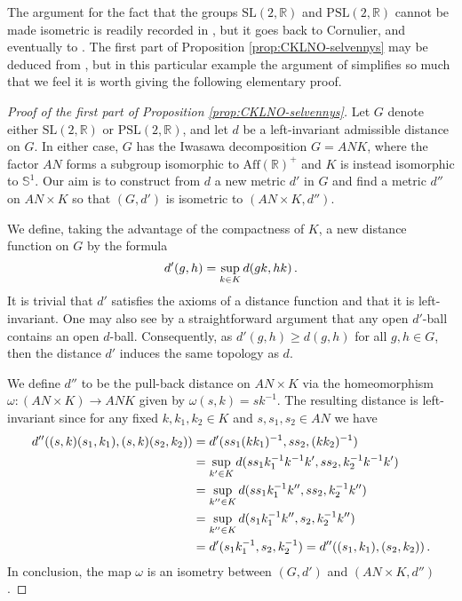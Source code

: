\documentclass[a4paper,12pt]{amsart}
\newcommand{\pp}{\mathrm}
\theoremstyle{plain}
\theoremstyle{definition}
\theoremstyle{plain}
\theoremstyle{remark}
\begin{document}
The argument  for the fact that the groups \( \pp{SL}(2,\mathbb{R}) \) and \( \pp{PSL}(2,\mathbb{R}) \) cannot be made isometric is readily recorded in \cite[Proposition 2.11]{avain:fasslerledonne}, but it goes back to Cornulier, and eventually to \cite[Theorem 2.2]{gordon-transitive}. The first part of Proposition \ref{prop:CKLNO-selvennys} may be deduced from  \cite[Theorem 3.24]{avain:CKLNO}, but in this particular example the argument of \cite{avain:CKLNO} simplifies so much that we feel it is worth giving the following elementary proof.

\begin{proof}[Proof of the first part of Proposition \ref{prop:CKLNO-selvennys}]
Let \( G \) denote either \( \pp{SL}(2,\mathbb{R}) \) or \( \pp{PSL}(2,\mathbb{R}) \), and let \( d \) be a left-invariant admissible distance on \( G \). In either case, \( G \) has the Iwasawa decomposition \( G = A N K \), where the factor \( AN \) forms a subgroup isomorphic to \( \pp{Aff}(\mathbb{R})^+ \) and \( K \) is instead isomorphic to \( \mathbb{S}^1 \). Our aim is to construct from \( d \) a new metric \( d' \) in \( G\) and find a metric \( d'' \) on \( AN \times K \) so that \( (G,d') \) is isometric to \( (AN \times K, d'') \).
	
	We define, taking the advantage of the compactness of \( K\), a new distance function on \( G \) by the formula
	\begin{equation*}
	d'(g,h) = \sup_{k \in K} d(gk, hk) \,.
	\end{equation*}
	It is trivial that \( d' \) satisfies the axioms of a distance function and that it is left-invariant.
	One may also see by a straightforward argument that  any open \( d' \)-ball contains an open \( d \)-ball. Consequently, as  \( d'(g,h) \ge d(g,h) \) for all \( g,h \in G \), then the distance  \( d' \) induces the same topology as \( d \).

	We define \( d'' \) to be the pull-back distance on \( AN \times K\) via the homeomorphism \( \omega \colon (AN \times K) \to ANK \) given by \( \omega(s,k) = s k^{-1} \). The resulting distance is left-invariant since for any fixed \( k,k_1,k_2 \in K \) and \( s,s_1,s_2 \in AN \) we have
	\begin{align*}
	d''((s,k)(s_1,k_1),(s,k)(s_2,k_2)) 
	&=
	d'(ss_1(kk_1)^{-1},ss_2,(kk_2)^{-1})
	\\
	&= 
	\sup_{k' \in K} d(ss_1k_1^{-1} k^{-1}k',ss_2,k_2^{-1}k^{-1}k')
	\\
	&= 
	\sup_{k'' \in K} d(ss_1k_1^{-1} k'',ss_2,k_2^{-1}k'')
	\\
	&= 
	\sup_{k'' \in K} d(s_1k_1^{-1} k'',s_2,k_2^{-1}k'')
	\\
	&= 
	d'(s_1k_1^{-1},s_2,k_2^{-1}) = d''((s_1,k_1),(s_2,k_2)) \,.
	\end{align*}
	In conclusion, the map \( \omega \) is an isometry between \( (G,d') \) and \( (AN \times K, d'') \).
\end{proof}
\end{document}
